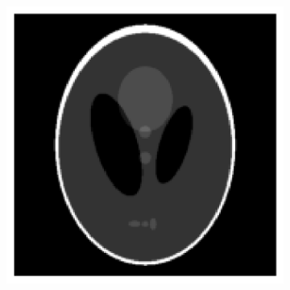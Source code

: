\documentclass[12pt]{article}
\begin{document}
\begin{figure}
\begin{subfigure}{.25\textwidth}
\end{subfigure}%
\begin{subfigure}{.25\textwidth}
    \centering
    \includegraphics[width=\textwidth]{../figures/GT.png}
\end{subfigure}\\
\begin{subfigure}{.073\textwidth}
    \centering

\end{subfigure}
\end{figure}
\end{document}
